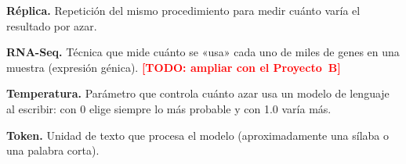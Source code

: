 \documentclass[unnumsec,webpdf,contemporary,large]{oup-authoring-template}
\newcommand{\TODO}[1]{\textcolor{red}{\textbf{[TODO: #1]}}}
\begin{document}
\begin{appendices}
\begin{unlist}
\item \textbf{Réplica.} Repetición del mismo procedimiento para medir cuánto varía el resultado por azar.
\item \textbf{RNA-Seq.} Técnica que mide cuánto se «usa» cada uno de miles de genes en una muestra (expresión génica). \TODO{ampliar con el Proyecto~B}
\item \textbf{Temperatura.} Parámetro que controla cuánto azar usa un modelo de lenguaje al escribir: con 0 elige siempre lo más probable y con 1.0 varía más.
\item \textbf{Token.} Unidad de texto que procesa el modelo (aproximadamente una sílaba o una palabra corta).
\end{unlist}

\end{appendices}
\end{document}
